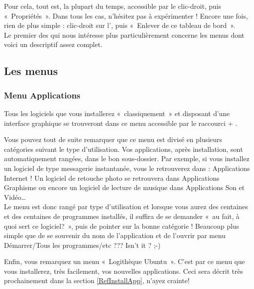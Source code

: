 Pour cela, tout est, la plupart du temps, accessible par le clic-droit, puis «~Propriétés~». Dans tous les cas, n'hésitez pas à expérimenter !
Encore une fois, rien de plus simple : clic-droit sur l', puis «~Enlever de ce tableau de bord~».\\
Le premier des  qui nous intéresse plus particulièrement concerne les menus dont voici un  descriptif assez complet.
\subsection{Les menus}
\label{RefMenuGNOME}
\subsubsection{Menu Applications}
Tous les logiciels que vous installerez «~classiquement~» et disposant d'une interface graphique se trouveront dans ce menu accessible par le raccourci  + .\par
Vous pouvez tout de suite remarquer que ce menu est divisé en plusieurs catégories suivant le type d'utilisation. Vos applications, après installation, sont automatiquement rangées, dans le bon sous-dossier. Par exemple, si vous installez un logiciel de type messagerie instantanée, vous le retrouverez dans : Applications \FlecheDroite Internet ! Un logiciel de retouche photo se retrouvera dans Applications \FlecheDroite Graphisme ou encore un logiciel de lecture de musique dans Applications \FlecheDroite Son et Vidéo\ldots{}\\
Le menu est donc rangé par type d'utilisation et lorsque vous aurez des centaines et des centaines de programmes installés, il suffira de se demander «~au fait, à quoi sert ce logiciel?~», puis de pointer sur la bonne catégorie ! Beaucoup plus simple que de se souvenir du nom de l'application et de l'ouvrir par menu Démarrer/Tous les programmes/etc ??? Isn't it ? ;-)\par
Enfin, vous remarquez un menu «~Logithèque Ubuntu~». C'est par ce menu que vous installerez, très facilement, vos nouvelles applications. Ceci sera décrit très prochainement dans la section \ref{RefInstallApp}, n'ayez crainte!\\
